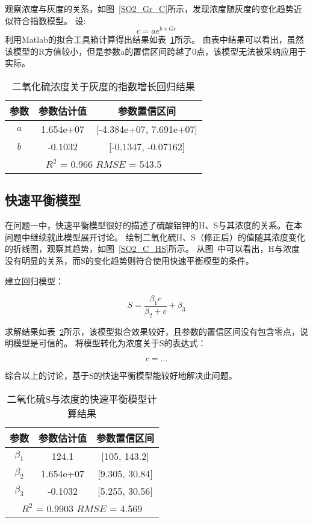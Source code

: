 观察浓度与灰度的关系，如图~\ref{SO2_Gr_C}所示，发现浓度随灰度的变化趋势近似符合指数模型。
设:
 $$c=ae^{b\times Gr}$$
利用Matlab的拟合工具箱计算得出结果如表~\ref{SO2_Gr_exp}所示。
由表中结果可以看出，虽然该模型的R方值较小，但是参数a的置信区间跨越了0点，该模型无法被采纳应用于实际。
\begin{table}[]
    \centering
    \caption{二氧化硫浓度关于灰度的指数增长回归结果}
    \label{SO2_Gr_exp}
    \begin{tabular}{@{}ccc@{}}
    \toprule
    参数       & 参数估计值      & 参数置信区间                   \\ \midrule
    $a$      & 1.654e+07     & {[}-4.384e+07, 7.691e+07{]}     \\
    $b$      &  -0.1032      & {[}-0.1347, -0.07162{]}       \\ \midrule
    \multicolumn{3}{c}{$R^2$ = 0.966 $RMSE$ = 543.5} \\ \bottomrule
    \end{tabular}
\end{table}


\subsection{快速平衡模型}

在问题一中，快速平衡模型很好的描述了硫酸铝钾的H、S与其浓度的关系。在本问题中继续就此模型展开讨论。
绘制二氧化硫H、S（修正后）的值随其浓度变化的折线图，观察其趋势，如图~\ref{SO2_C_HS}所示。
从图~中可以看出，H与浓度没有明显的关系，而S的变化趋势则符合使用快速平衡模型的条件。



建立回归模型：


   $$ S = \frac{\beta_1 c}{\beta_2+c}+\beta_3$$


求解结果如表~\ref{SO2_S_MM}所示，该模型拟合效果较好，且参数的置信区间没有包含零点，说明模型是可信的。
将模型转化为浓度关于S的表达式：


    $$c = ...$$


综合以上的讨论，基于S的快速平衡模型能较好地解决此问题。

\begin{table}[]
    \centering
    \caption{二氧化硫S与浓度的快速平衡模型计算结果}
    \label{SO2_S_MM}
    \begin{tabular}{@{}ccc@{}}
    \toprule
    参数       & 参数估计值      & 参数置信区间                   \\ \midrule
    $\beta_1$      & 124.1     & {[}105, 143.2{]}     \\
    $\beta_2$      & 1.654e+07     & {[}9.305, 30.84{]}     \\
    $\beta_3$      &  -0.1032      & {[}5.255, 30.56{]}       \\ \midrule
    \multicolumn{3}{c}{$R^2$ = 0.9903 $RMSE$ = 4.569} \\ \bottomrule
    \end{tabular}
\end{table}
